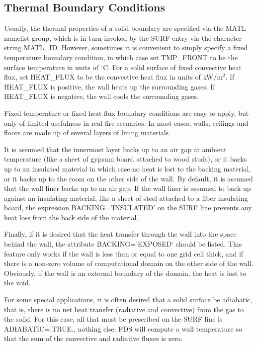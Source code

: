 \documentclass[11pt]{book}
\begin{document}
\subsection{Thermal Boundary Conditions}
\label{info:thermalboundary}

Usually, the thermal properties of a solid boundary are specified via the
{\ct MATL} namelist group, which is in turn invoked by the {\ct SURF} entry via
the character string {\ct MATL\_ID}. However, sometimes it is convenient to
simply specify a fixed temperature boundary condition, in which case set
{\ct TMP\_FRONT} to be the surface temperature in units of $^\circ$C.
For a solid surface of fixed convective heat flux, set {\ct HEAT\_FLUX} to be
the convective heat flux in units of kW/m$^2$. If {\ct HEAT\_FLUX} is
positive, the wall heats up the surrounding gases. If {\ct HEAT\_FLUX}
is negative, the wall cools the surrounding gases.

Fixed temperature or fixed heat flux boundary conditions are
easy to apply, but only of limited usefulness in real fire scenarios.
In most cases, walls, ceilings and floors are made up of several layers
of lining materials.

It is assumed that the innermost layer backs up to an air gap at ambient
temperature (like a sheet of gypsum board attached to wood studs), or
it backs up to an insulated material in which case no heat is lost to
the backing material, or it backs up to the room on the other side of
the wall. By default, it is assumed that the wall liner backs up to an air gap.
If the wall liner is assumed to back up against an insulating material,
like a sheet of steel attached to a fiber insulating board, the expression
{\ct BACKING='INSULATED'} on the {\ct SURF} line prevents any heat
loss from the back side of the material.

Finally, if it is desired that the heat transfer
through the wall into the space behind the wall, the attribute
{\ct BACKING='EXPOSED'} should be listed. This feature only works
if the wall is less than or equal to one grid cell thick, and if there is a non-zero volume
of computational domain on the other side of the wall. Obviously, if
the wall is an external boundary of the domain, the heat is lost
to the void.

For some special applications, it is often desired that a solid
surface be adiabatic, that is, there is no net heat transfer
(radiative and convective) from the gas to the solid. For this case,
all that must be prescribed on the {\ct SURF} line is {\ct
ADIABATIC=.TRUE.}, nothing else.  FDS will compute a wall temperature
so that the sum of the convective and radiative fluxes is zero.
\end{document}
